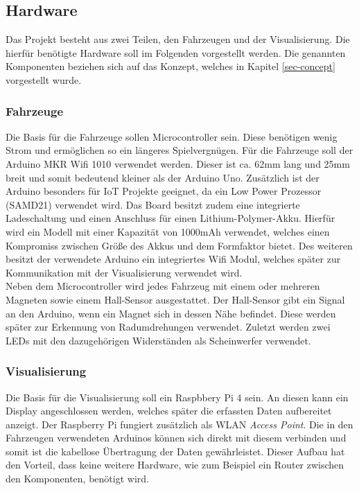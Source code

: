 \documentclass[.../Dokumentation.tex]{subfiles}
\begin{document}
\subsection{Hardware}\label{sec-components-hardware}
Das Projekt besteht aus zwei Teilen, den Fahrzeugen und der Visualisierung.
Die hierfür benötigte Hardware soll im Folgenden vorgestellt werden.
Die genannten Komponenten beziehen sich auf das Konzept, welches in Kapitel 
\ref{sec-concept} vorgestellt wurde.
\subsubsection{Fahrzeuge}
Die Basis für die Fahrzeuge sollen Microcontroller sein. Diese benötigen 
wenig Strom und ermöglichen so ein längeres Spielvergnügen. 
Für die Fahrzeuge soll der Arduino MKR Wifi 1010 verwendet werden. Dieser ist 
ca. 62mm lang und 25mm breit und somit bedeutend kleiner als der Arduino Uno. 
Zusätzlich ist der Arduino besonders für IoT Projekte geeignet, da ein Low 
Power Prozessor (SAMD21) verwendet wird. Das Board besitzt zudem eine 
integrierte Ladeschaltung und einen Anschluss für einen Lithium-Polymer-Akku. 
Hierfür wird ein Modell mit einer Kapazität von 1000mAh verwendet, welches 
einen Kompromiss zwischen Größe des Akkus und dem Formfaktor bietet. Des 
weiteren besitzt der verwendete Arduino ein integriertes Wifi Modul, welches 
später zur Kommunikation mit der Visualisierung verwendet wird. \\
Neben dem Microcontroller wird jedes Fahrzeug mit einem oder mehreren Magneten sowie einem 
Hall-Sensor ausgestattet. Der Hall-Sensor gibt ein Signal an den Arduino, 
wenn ein Magnet sich in dessen Nähe befindet. Diese werden später zur Erkennung 
von Radumdrehungen verwendet. Zuletzt werden zwei LEDs mit den dazugehörigen 
Widerständen als Scheinwerfer verwendet.

\subsubsection{Visualisierung}
Die Basis für die Visualisierung soll ein Raspbbery Pi 4 sein. An diesen kann 
ein Display angeschlossen werden, welches später die erfassten Daten 
aufbereitet anzeigt. Der Raspberry Pi fungiert zusätzlich als WLAN 
\textit{Access Point}. Die in den Fahrzeugen verwendeten Arduinos können sich 
direkt mit diesem verbinden und somit ist die kabellose Übertragung der Daten 
gewährleistet. Dieser Aufbau hat den Vorteil, dass keine weitere 
Hardware, wie zum Beispiel ein Router zwischen den Komponenten, benötigt wird.
\end{document}
